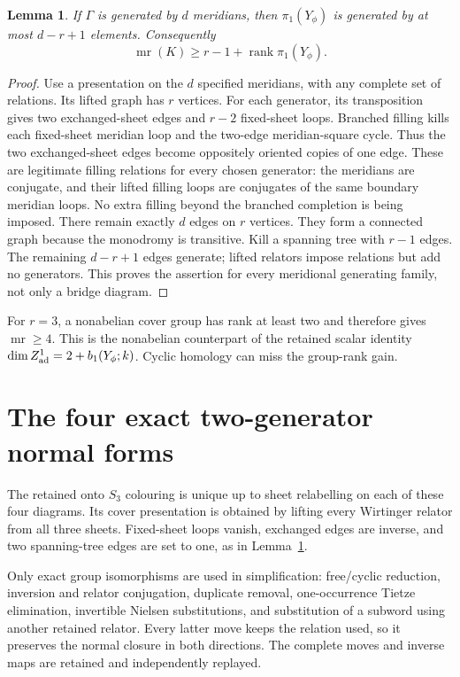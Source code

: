 \documentclass[11pt]{article}
\newtheorem{lemma}[theorem]{Lemma}
\newcommand{\mr}{\operatorname{mr}}
\newcommand{\rank}{\operatorname{rank}}
\begin{document}
\begin{lemma}\label{lem:rank}
If $\Gamma$ is generated by $d$ meridians, then
$\pi_1(Y_\phi)$ is generated by at most $d-r+1$ elements.
Consequently
\[
                    \mr(K)\ge r-1+\rank\pi_1(Y_\phi).
\]
\end{lemma}
\begin{proof}
Use a presentation on the $d$ specified meridians, with any
complete set of relations. Its lifted graph has $r$ vertices.
For each generator, its transposition gives two exchanged-sheet
edges and $r-2$ fixed-sheet loops. Branched filling kills each
fixed-sheet meridian loop and the two-edge meridian-square
cycle. Thus the two exchanged-sheet edges become oppositely
oriented copies of one edge.
These are legitimate filling relations for every chosen
generator: the meridians are conjugate, and their lifted
filling loops are conjugates of the same boundary meridian
loops. No extra filling beyond the branched completion is
being imposed. There remain exactly $d$ edges
on $r$ vertices. They form a connected graph because the
monodromy is transitive. Kill a spanning tree with $r-1$ edges.
The remaining $d-r+1$ edges generate; lifted relators impose
relations but add no generators. This proves the assertion for
every meridional generating family, not only a bridge diagram.
\end{proof}

For $r=3$, a nonabelian cover group has rank at least two and
therefore gives $\mr\ge4$. This is the nonabelian counterpart
of the retained scalar identity
$\dim Z^1_{\rm ad}=2+b_1(Y_\phi;k)$. Cyclic homology can miss
the group-rank gain.

\section{The four exact two-generator normal forms}

The retained onto $S_3$ colouring is unique up to sheet
relabelling on each of these four diagrams. Its cover
presentation is obtained by lifting every Wirtinger relator
from all three sheets. Fixed-sheet loops vanish, exchanged
edges are inverse, and two spanning-tree edges are set to one,
as in Lemma~\ref{lem:rank}.

Only exact group isomorphisms are used in simplification:
free/cyclic reduction, inversion and relator conjugation,
duplicate removal, one-occurrence Tietze elimination,
invertible Nielsen substitutions, and substitution of a
subword using another retained relator. Every latter move
keeps the relation used, so it preserves the normal closure
in both directions. The complete moves and inverse maps are
retained and independently replayed.
\end{document}
